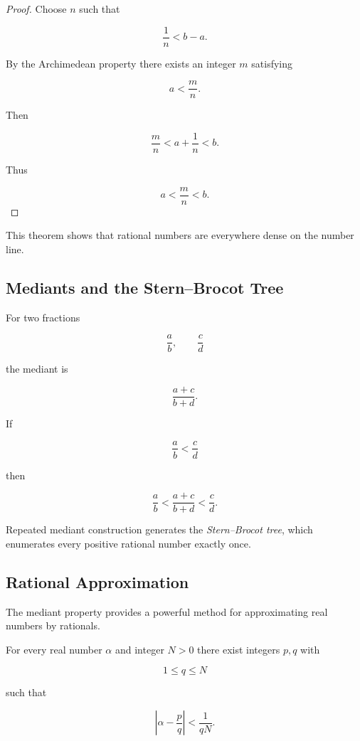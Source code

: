 \begin{proof}

Choose $n$ such that

\[
\frac{1}{n} < b-a .
\]

By the Archimedean property there exists an integer $m$ satisfying

\[
a < \frac{m}{n}.
\]

Then

\[
\frac{m}{n} < a + \frac{1}{n} < b.
\]

Thus

\[
a < \frac{m}{n} < b.
\]

\end{proof}

This theorem shows that rational numbers are everywhere dense on the
number line.

\subsection{Mediants and the Stern--Brocot Tree}

\begin{definition}[Mediant]

For two fractions

\[
\frac{a}{b},\qquad \frac{c}{d}
\]

the mediant is

\[
\frac{a+c}{b+d}.
\]

\end{definition}

\begin{theorem}

If

\[
\frac{a}{b} < \frac{c}{d}
\]

then

\[
\frac{a}{b}
<
\frac{a+c}{b+d}
<
\frac{c}{d}.
\]

\end{theorem}

Repeated mediant construction generates the
\emph{Stern--Brocot tree}, which enumerates every positive rational number
exactly once.

\subsection{Rational Approximation}

The mediant property provides a powerful method for approximating
real numbers by rationals.

\begin{theorem}

For every real number $\alpha$ and integer $N>0$ there exist integers
$p,q$ with

\[
1\le q\le N
\]

such that

\[
\left|\alpha-\frac{p}{q}\right|<\frac{1}{qN}.
\]

\end{theorem}

